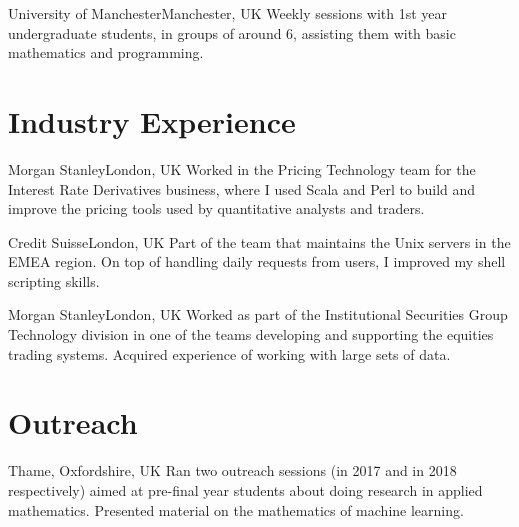 \documentclass[10pt,a4paper,roman]{moderncv} %
\begin{document}
        {University of Manchester}{Manchester, UK}{}
        {
          Weekly sessions with 1st year 
          undergraduate students, in groups of around 6,
          assisting them with basic mathematics and programming.
        }


\section{Industry Experience}

        {Morgan Stanley}{London, UK}{}
        {
          Worked in the Pricing Technology team for the Interest 
          Rate Derivatives business, where I used Scala and Perl 
          to build and improve the pricing tools used 
          by quantitative analysts and traders. 
        }

        {Credit Suisse}{London, UK}{}
        {
          Part of the team that maintains the Unix servers in the 
          EMEA region. On top of handling daily requests from users, 
          I improved my shell scripting skills.
        }

        {Morgan Stanley}{London, UK}{}
        {
          Worked as part of the Institutional Securities Group Technology 
          division in one of the teams developing and supporting the equities 
          trading systems. Acquired experience of working with large sets of data.
        }

\section{Outreach}

        {Thame, Oxfordshire, UK}{}{}
        {
          Ran two outreach sessions (in 2017 and in 2018 respectively) 
          aimed at pre-final year 
          students about doing research in applied mathematics.
          Presented material on the mathematics of machine learning.
        }

\end{document}
